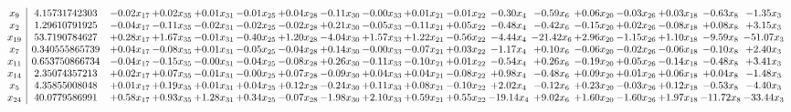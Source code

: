 \documentclass[9pt]{article}
\begin{document}
 \[\begin{array}{c| c c@{\hskip 2pt} c@{\hskip 2pt} c@{\hskip 2pt} c@{\hskip 2pt} c@{\hskip 2pt} c@{\hskip 2pt} c@{\hskip 2pt} c@{\hskip 2pt} c@{\hskip 2pt} c@{\hskip 2pt} c@{\hskip 2pt} c@{\hskip 2pt} c@{\hskip 2pt} c@{\hskip 2pt} c@{\hskip 2pt} c@{\hskip 2pt} }
 x_{9}   &  4.15731742303 & -0.02 x_{17} & +  0.02 x_{35} & +  0.01 x_{31} & -0.01 x_{25} & +  0.04 x_{28} & -0.11 x_{30} & -0.00 x_{33} & +  0.01 x_{21} & -0.01 x_{22} & -0.30 x_{4} & -0.59 x_{6} & +  0.06 x_{20} & -0.03 x_{26} & +  0.03 x_{18} & -0.63 x_{8} & -1.35 x_{3}\\
 x_{2}   &  1.29610791925 & -0.04 x_{17} & -0.11 x_{35} & -0.02 x_{31} & -0.02 x_{25} & -0.02 x_{28} & +  0.21 x_{30} & -0.05 x_{33} & -0.11 x_{21} & +  0.05 x_{22} & -0.48 x_{4} & -0.42 x_{6} & -0.15 x_{20} & +  0.02 x_{26} & -0.08 x_{18} & +  0.08 x_{8} & +  3.15 x_{3}\\
 x_{19}   &  53.7190784627 & +  0.28 x_{17} & +  1.67 x_{35} & -0.01 x_{31} & -0.40 x_{25} & +  1.20 x_{28} & -4.04 x_{30} & +  1.57 x_{33} & +  1.22 x_{21} & -0.56 x_{22} & -4.44 x_{4} & -21.42 x_{6} & +  2.96 x_{20} & -1.15 x_{26} & +  1.10 x_{18} & -9.59 x_{8} & -51.07 x_{3}\\
 x_{7}   &  0.340555865739 & +  0.04 x_{17} & -0.08 x_{35} & +  0.01 x_{31} & -0.05 x_{25} & -0.04 x_{28} & +  0.14 x_{30} & -0.00 x_{33} & -0.07 x_{21} & +  0.03 x_{22} & -1.17 x_{4} & +  0.10 x_{6} & -0.06 x_{20} & -0.02 x_{26} & -0.06 x_{18} & -0.10 x_{8} & +  2.40 x_{3}\\
 x_{11}   &  0.653750866734 & -0.04 x_{17} & -0.15 x_{35} & -0.00 x_{31} & -0.04 x_{25} & -0.08 x_{28} & +  0.26 x_{30} & -0.11 x_{33} & -0.10 x_{21} & +  0.01 x_{22} & -0.54 x_{4} & +  0.26 x_{6} & -0.19 x_{20} & +  0.05 x_{26} & -0.14 x_{18} & -0.48 x_{8} & +  3.41 x_{3}\\
 x_{14}   &  2.35074357213 & +  0.02 x_{17} & +  0.07 x_{35} & -0.01 x_{31} & -0.00 x_{25} & +  0.07 x_{28} & -0.09 x_{30} & +  0.04 x_{33} & +  0.04 x_{21} & -0.08 x_{22} & +  0.98 x_{4} & -0.48 x_{6} & +  0.09 x_{20} & +  0.01 x_{26} & +  0.06 x_{18} & +  0.04 x_{8} & -1.48 x_{3}\\
 x_{5}   &  4.35855008048 & +  0.01 x_{17} & +  0.19 x_{35} & +  0.01 x_{31} & +  0.04 x_{25} & +  0.12 x_{28} & -0.24 x_{30} & +  0.11 x_{33} & +  0.08 x_{21} & -0.10 x_{22} & +  2.02 x_{4} & -0.12 x_{6} & +  0.23 x_{20} & -0.03 x_{26} & +  0.12 x_{18} & -0.53 x_{8} & -4.40 x_{3}\\
 x_{24}   &  40.0779586991 & +  0.58 x_{17} & +  0.93 x_{35} & +  1.28 x_{31} & +  0.34 x_{25} & -0.07 x_{28} & -1.98 x_{30} & +  2.10 x_{33} & +  0.59 x_{21} & +  0.55 x_{22} & -19.14 x_{4} & +  9.02 x_{6} & +  1.60 x_{20} & -1.60 x_{26} & +  1.97 x_{18} & -11.72 x_{8} & -33.44 x_{3}\\

\end{array}\]
\end{document}
